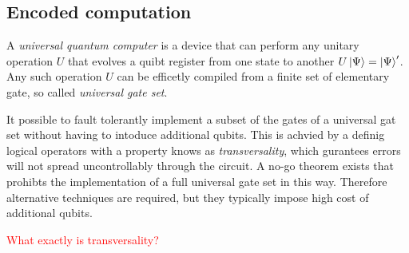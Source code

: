 \subsection{Encoded computation}
A \textit{universal quantum computer} is a device that can perform any unitary operation $U$ 
that evolves a quibt register from one state to another $U\ket{\Psi} = \ket{\Psi}'$.
Any such operation $U$ can be efficetly compiled from a finite set of elementary gate, 
so called \textit{universal gate set}. \cite{QECintro}

It possible to fault tolerantly implement a subset of the gates of a universal gat set 
without having to intoduce additional qubits. 
This is achvied by a definig logical operators with a property knows as \textit{transversality}, 
which gurantees errors will not spread uncontrollably through the circuit.
A no-go theorem exists that prohibts the implementation of a full universal gate set in this way. 
Therefore alternative techniques are required, but they typically impose high cost of additional qubits. \cite{QECintro}

\textcolor{red}{What exactly is transversality?}



